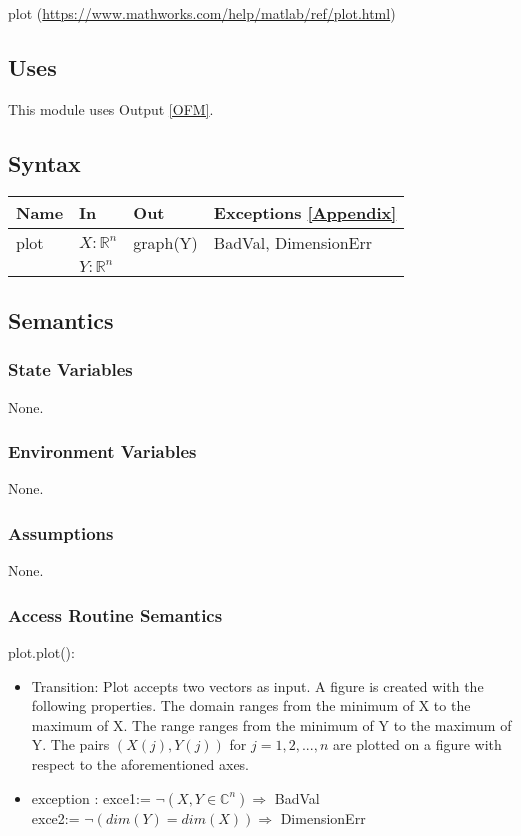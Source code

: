 \documentclass[12pt, titlepage]{article}
\begin{document}
plot (\url{https://www.mathworks.com/help/matlab/ref/plot.html})

\subsection{Uses}

This module uses Output \ref{OFM}. 

\subsection{Syntax}

\begin{center}
	\begin{tabular}{p{2cm} p{4cm} p{4cm} p{5cm}}
		\hline
		\textbf{Name} & \textbf{In} & \textbf{Out} & \textbf{Exceptions} 
		\ref{Appendix} \\
		\hline
		plot & $X : \mathbb{R}^{n}$ & graph(Y) & 
		BadVal, DimensionErr \\ 
		& $Y : \mathbb{R}^{n}$ &  &  \\ 
		\hline
	\end{tabular}
\end{center}

\subsection{Semantics}

\subsubsection{State Variables}

None.

\subsubsection{Environment Variables}

None.

\subsubsection{Assumptions}

None.

\subsubsection{Access Routine Semantics}

\noindent plot.plot():
\begin{itemize}
	\item Transition: Plot accepts two vectors as input. A figure is created 
	with the following properties. The domain ranges from the minimum of X to 
	the maximum of X. The range ranges from the minimum of Y to the maximum of 
	Y. The pairs $(X(j),Y(j))$ for $j=1,2,...,n$ are plotted on a figure with 
	respect to the aforementioned axes. 
	\item exception : exce1:= $\neg(X,Y \in \mathbb{C}^{n}) \Rightarrow$ 
	BadVal \\
	exce2:= $\neg (dim(Y) = dim(X)) \Rightarrow$ DimensionErr \\
\end{itemize}
\end{document}
